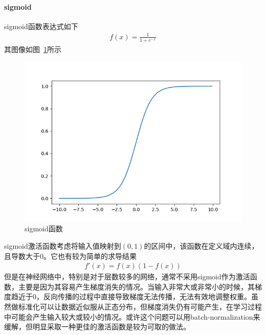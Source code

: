 \paragraph{sigmoid}
sigmoid函数表达式如下
\begin{eqnarray}
f(x)=\frac{1}{1+e^{-x}}
\end{eqnarray}
其图像如图~\ref{fig:bp3}所示
\begin{figure}[htb]
\centering
\includegraphics[scale=0.5]{../figures/NN3.png} 
\caption{sigmoid函数}
\label{fig:bp3}
\end{figure}
sigmoid激活函数考虑将输入值映射到$(0,1)$的区间中，该函数在定义域内连续，且导数大于0。它也有较为简单的求导结果
\begin{eqnarray}
f'(x)=f(x)(1-f(x))
\end{eqnarray}
但是在神经网络中，特别是对于层数较多的网络，通常不采用sigmoid作为激活函数，主要是因为其容易产生梯度消失的情况。当输入非常大或非常小的时候，其梯度趋近于0，反向传播的过程中直接导致梯度无法传播，无法有效地调整权重。虽然做标准化可以让数据近似服从正态分布，但梯度消失仍有可能产生，在学习过程中可能会产生输入较大或较小的情况。或许这个问题可以用batch-normalization来缓解，但明显采取一种更佳的激活函数是较为可取的做法。
